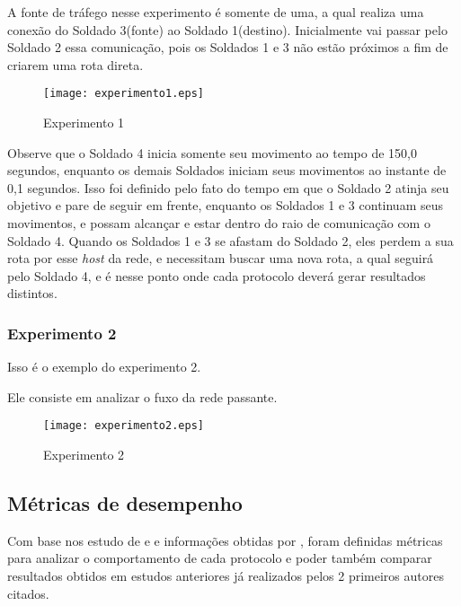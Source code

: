 A fonte de tr\'afego nesse experimento \'e somente de uma, a qual realiza uma conex\~ao do Soldado 3(fonte) ao Soldado 1(destino). Inicialmente vai passar pelo Soldado 2 essa comunica\c{c}\~ao, pois os Soldados 1 e 3 n\~ao est\~ao pr\'oximos a fim de criarem uma rota direta.

\begin{figure}[H]
	\centering
	\texttt{[image: experimento1.eps]}
	\caption{Experimento 1}
	\label{figExp1}
\end{figure}

Observe que o Soldado 4 inicia somente seu movimento ao tempo de 150,0 segundos, enquanto os demais Soldados iniciam seus movimentos ao instante de 0,1 segundos.
Isso foi definido pelo fato do tempo em que o Soldado 2 atinja seu objetivo e pare de seguir em frente, enquanto os Soldados 1 e 3 continuam seus movimentos, e possam alcan\c{c}ar e estar dentro do raio de comunica\c{c}\~ao com o Soldado 4.
Quando os Soldados 1 e 3 se afastam do Soldado 2, eles perdem a sua rota por esse \textit{host} da rede, e necessitam buscar uma nova rota, a qual seguir\'a pelo Soldado 4, e \'e nesse ponto onde cada protocolo dever\'a gerar resultados distintos.

\subsubsection{Experimento 2}
Isso \'e o exemplo do experimento 2.

Ele consiste em analizar o fuxo da rede passante.

\begin{figure}[H]
	\centering
	\texttt{[image: experimento2.eps]}
	\caption{Experimento 2}
	\label{figExp2}
\end{figure}


\subsection{M\'etricas de desempenho}
Com base nos estudo de \cite{pereira} e \cite{schimidt} e informa\c{c}\~oes obtidas por \cite{salles}, foram definidas m\'etricas para analizar o comportamento de cada protocolo e poder tamb\'em comparar resultados obtidos em estudos anteriores j\'a realizados pelos 2 primeiros autores citados.

